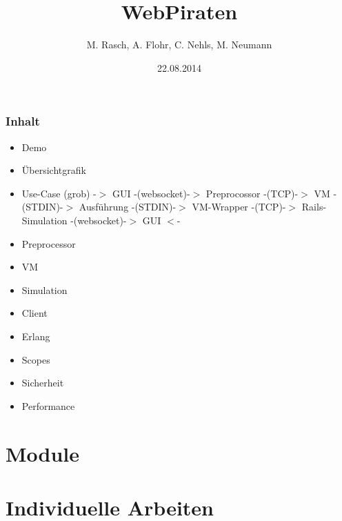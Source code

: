 \documentclass{beamer}
\begin{document}

\title{WebPiraten}  
\author{M. Rasch, A. Flohr, C. Nehls, M. Neumann}
\date{22.08.2014} 

\begin{frame}
\maketitle
\end{frame} 

\begin{frame}
\frametitle{Inhalt}
\tableofcontents
\end{frame}

\begin{frame}
\begin{itemize}
\item Demo
\item Übersichtgrafik
\item Use-Case (grob)\newline
-$>$ GUI -(websocket)-$>$ Preprocossor -(TCP)-$>$ VM -(STDIN)-$>$ Ausführung -(STDIN)-$>$ VM-Wrapper -(TCP)-$>$ Rails-Simulation -(websocket)-$>$ GUI $<$-
\item Preprocessor
\item VM
\item Simulation
\item Client
\item Erlang
\item Scopes
\item Sicherheit
\item Performance
\end{itemize}
\end{frame}

\section{Module}






\section{Individuelle Arbeiten}





\end{document}
